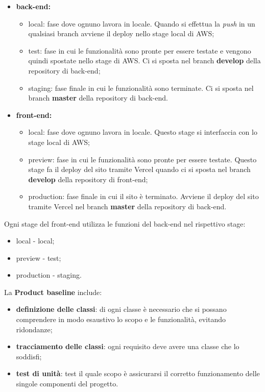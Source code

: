 \begin{itemize}
\item \textbf{back-end:}
	\begin{itemize}
	\item local: fase dove ognuno lavora in locale. Quando si effettua la \textit{push} in un qualsiasi branch avviene il deploy nello stage local di AWS;
	\item test: fase in cui le funzionalità sono pronte per essere testate e vengono quindi spostate nello stage di AWS. Ci si sposta nel branch \textbf{develop} della repository di back-end;
	\item staging: fase finale in cui le funzionalità sono terminate. Ci si sposta nel branch \textbf{master} della repository di back-end.
	\end{itemize}
\item \textbf{front-end:}
	\begin{itemize}
	\item local: fase dove ognuno lavora in locale. Questo stage si interfaccia con lo stage local di AWS;
	\item preview: fase in cui le funzionalità sono pronte per essere testate. Questo stage fa il deploy del sito tramite Vercel quando ci si sposta nel branch \textbf{develop} della repository di front-end;
	\item production: fase finale in cui il sito è terminato. Avviene il deploy del sito tramite Vercel nel branch \textbf{master} della repository di back-end.
	\end{itemize}
\end{itemize} 
Ogni stage del front-end utilizza le funzioni del back-end nel rispettivo stage:
\begin{itemize}
	\item local - local;
	\item preview - test;
	\item production - staging.
	\end{itemize}

La \textbf{Product baseline} include:
\begin{itemize}
\item \textbf{definizione delle classi}: di ogni classe è necessario che si possano comprendere in modo esaustivo lo scopo e le funzionalità, evitando ridondanze;
\item \textbf{tracciamento delle classi}: ogni requisito deve avere una classe che lo soddisfi; 
\item \textbf{test di unità}: test il quale scopo è assicurarsi il corretto funzionamento delle singole componenti del progetto.
\end{itemize}